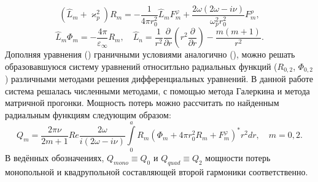 \documentclass[12pt, a4paper]{article}
\def \eps {\varepsilon}
\def \w {\omega}
\def \ph {\varphi}
\def \kp { \varkappa}
\begin{document}
\begin{equation} 	
	(\hat L_m + \kp_p^2) R_m = -\frac{1}{4 \pi r_0^2}\hat L_m F_m^\ph  + \frac{2\w(2\w - i \nu)}{\w_p^2r_0^2}F_m^\rho,
\end{equation}
\begin{equation} 	
	\hat L_m \Phi_m = -\frac{4\pi}{\eps_\infty}R_m,  \quad \hat{L}_n = \frac{1}{r^2} \frac{\partial}{\partial r} \left( r^2 \frac{\partial}{\partial r} \right) - \frac{m(m+1)}{r^2}.
\end{equation}
Дополняя уравнения () граничными условиями аналогично (), можно решать образовавшуюся систему уравнений относитльно радиальных функций ($R_{0,2}$, $\Phi_{0,2}$) различными методами решения дифференциальных уравнений. В данной работе система решалась численными методами, с помощью метода Галеркина и метода матричной прогонки. Мощность потерь можно рассчитать по найденным радиальным функциям следующим образом:
\begin{equation} 	
Q_m = \frac{2\pi\nu}{2m+1}Re \frac{2\w}{i(2\w - i \nu)} \int\limits_0^a R_m(\Phi_m  + 4\pi r_0^2R_m + F_m^\ph)^*r^2dr, \quad m=0,2.	
\end{equation}
В ведённых обозначениях, $Q_{mono} \equiv Q_0$ и $Q_{quad} \equiv Q_2$ мощности
потерь монопольной и квадрупольной составляющей второй гармоники
соответственно. 
\end{document}
